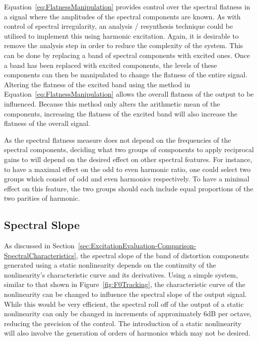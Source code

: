 		Equation~\ref{eq:FlatnessManipulation} provides control over the spectral flatness in a signal where the
		amplitudes of the spectral components are known. As with control of spectral irregularity, an analysis /
		resynthesis technique could be utilised to implement this using harmonic excitation.  Again, it is
		desirable to remove the analysis step in order to reduce the complexity of the system.  This can be done by
		replacing a band of spectral components with excited ones. Once a band has been replaced with excited
		components, the levels of these components can then be manipulated to change the flatness of the entire
		signal. Altering the flatness of the excited band using the method in
		Equation~\ref{eq:FlatnessManipulation} allows the overall flatness of the output to be influenced. Because
		this method only alters the arithmetic mean of the components, increasing the flatness of the excited band
		will also increase the flatness of the overall signal.

		As the spectral flatness measure does not depend on the frequencies of the spectral components, deciding
		what two groups of components to apply reciprocal gains to will depend on the desired effect on other
		spectral features. For instance, to have a maximal effect on the odd to even harmonic ratio, one could
		select two groups which consist of odd and even harmonics respectively. To have a minimal effect on this
		feature, the two groups should each include equal proportions of the two parities of harmonic.

	\subsection{Spectral Slope}
	\label{sec:FeatureControl-Parameterisation-Slope}
		As discussed in Section~\ref{sec:ExcitationEvaluation-Comparison-SpectralCharacteristics}, the spectral
		slope of the band of distortion components generated using a static nonlinearity depends on the continuity
		of the nonlinearity's characteristic curve and its derivatives. Using a simple system, similar to that
		shown in Figure~\ref{fig:F0Tracking}, the characteristic curve of the nonlinearity can be changed to
		influence the spectral slope of the output signal. While this would be very efficient, the spectral roll
		off of the output of a static nonlinearity can only be changed in increments of approximately 6dB per
		octave, reducing the precision of the control. The introduction of a static nonlinearity will also involve
		the generation of orders of harmonics which may not be desired.

